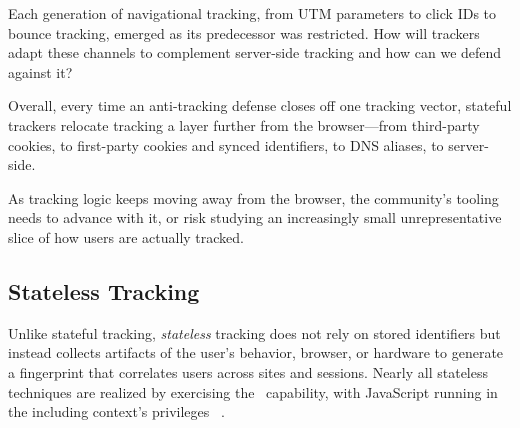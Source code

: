 \begin{opbox}
Each generation of navigational tracking, from UTM parameters to click IDs to bounce tracking, emerged as its predecessor was restricted. How will trackers adapt these channels to complement server-side tracking and how can we defend against it?
\end{opbox}


\noindent Overall, every time an anti-tracking defense closes off one tracking vector, stateful trackers relocate tracking a layer further from the browser---from third-party cookies, to first-party cookies and synced identifiers, to DNS aliases, to server-side.

\begin{opbox}
As tracking logic keeps moving away from the browser, the community's tooling
needs to advance with it, or risk studying an increasingly small unrepresentative slice of how users are actually tracked.
\end{opbox}












\subsection{Stateless Tracking}
\label{sec:stateless-tracking}

Unlike stateful tracking, \textit{stateless} tracking does not rely on stored identifiers but instead collects artifacts of the user's behavior, browser, or hardware to generate a fingerprint that correlates users across sites and sessions.
%
Nearly all stateless techniques are realized by exercising the \symExecution\ capability, with JavaScript running in the including context's privileges \symInclusion\ .


